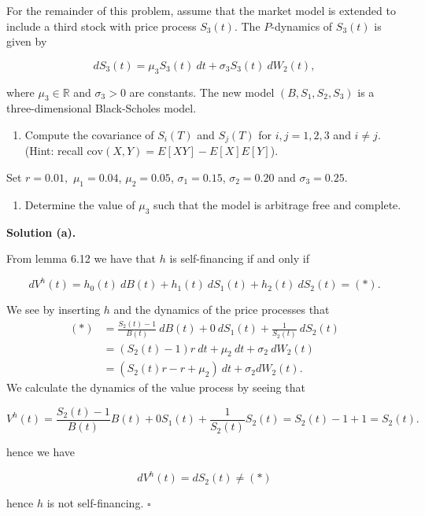 \documentclass[a4paper,12pt,openany]{book}
\providecommand{\tightlist}{%
 \setlength{\itemsep}{0pt}\setlength{\parskip}{0pt}}
\begin{document}
For the remainder of this problem, assume that the market model is extended to include a third stock with price process \(S_3(t)\). The \(P\)-dynamics of \(S_3(t)\) is given by

\[
dS_3(t)=\mu_3 S_3(t)\ dt+\sigma_3 S_3(t)\ dW_2(t),
\]

where \(\mu_3\in\mathbb{R}\) and \(\sigma_3>0\) are constants. The new model \((B,S_1,S_2,S_3)\) is a three-dimensional Black-Scholes model.

\begin{enumerate}
\def\labelenumi{\alph{enumi}.}
\setcounter{enumi}{5}
\tightlist
\item
  Compute the covariance of \(S_i(T)\) and \(S_j(T)\) for \(i,j=1,2,3\) and \(i\ne j\). (Hint: recall \(\text{cov}(X,Y)=E[XY]-E[X]E[Y]\)).
\end{enumerate}

Set \(r=0.01,\) \(\mu_1=0.04\), \(\mu_2=0.05\), \(\sigma_1=0.15\), \(\sigma_2=0.20\) and \(\sigma_3=0.25\).

\begin{enumerate}
\def\labelenumi{\alph{enumi}.}
\setcounter{enumi}{6}
\tightlist
\item
  Determine the value of \(\mu_3\) such that the model is arbitrage free and complete.
\end{enumerate}

\noindent\makebox[\linewidth]{\rule{\textwidth}{0.4pt}}

\textbf{Solution (a).}

From lemma 6.12 we have that \(h\) is self-financing if and only if

\[
dV^h(t)=h_0(t)\ dB(t)+h_1(t)\ dS_1(t)+h_2(t)\ dS_2(t)=(*).
\]

We see by inserting \(h\) and the dynamics of the price processes that
\begin{align*}
(*)&=\frac{S_2(t)-1}{B(t)}\ dB(t)+0\ dS_1(t)+\frac{1}{S_2(t)}\ dS_2(t)\\
&=(S_2(t)-1)r\ dt+\mu_2\ dt+\sigma_2\ dW_2(t)\\
&=\left(S_2(t)r-r+\mu_2\right)\ dt+\sigma_2 dW_2(t).
\end{align*}
We calculate the dynamics of the value process by seeing that

\[
V^h(t)=\frac{S_2(t)-1}{B(t)}B(t)+0S_1(t)+\frac{1}{S_2(t)}S_2(t)=S_2(t)-1+1=S_2(t).
\]

hence we have

\[
dV^h(t)=dS_2(t)\ne(*)
\]

hence \(h\) is not self-financing. \(\square\)
\end{document}
